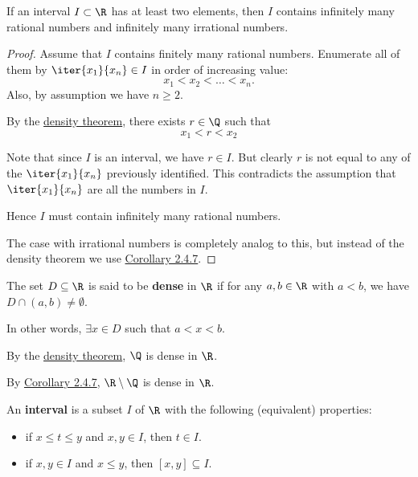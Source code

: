 \label{e43d143}

If an interval $I\subset\R$ has at least two elements, then $I$ contains
infinitely many rational numbers and infinitely many irrational numbers.

\begin{proof}
  \def\all{\iter{x_1}{x_n}}

  Assume that $I$ contains finitely many rational numbers. Enumerate all of them
  by $\all\in I$ in order of increasing value:
  $$
    x_1<x_2<\ldots<x_n.
  $$
  Also, by assumption we have $n\geq2$.

  By the \href{d0c9c52}{density theorem}, there exists $r\in\Q$ such that
  $$
    x_1<r<x_2
  $$

  Note that since $I$ is an interval, we have $r\in I$. But clearly $r$ is not
  equal to any of the $\all$ previously identified. This contradicts the
  assumption that $\all$ are all the numbers in $I$.

  Hence $I$ must contain infinitely many rational numbers.

  The case with irrational numbers is completely analog to this, but instead of
  the density theorem we use \href{b0d86cf}{Corollary 2.4.7}.
\end{proof}

\label{e929c5e}

The set $D\subseteq\R$ is said to be \textbf{dense} in $\R$ if for any
$a,b\in\R$ with $a<b$, we have $D\cap(a,b)\neq\emptyset$.

In other words, $\exists x\in D$ such that $a<x<b$.

\label{bb3cf6b}

\begin{enumerati}
  \item By the \href{d0c9c52}{density theorem}, $\Q$ is dense in $\R$.
  \item By \href{b0d86cf}{Corollary 2.4.7}, $\R\setminus\Q$ is dense in $\R$.
\end{enumerati}

\label{c65e94a}

An \textbf{interval} is a subset $I$ of $\R$ with the following (equivalent)
properties:
\begin{itemize}
  \item if $x\leq t\leq y$ and $x,y\in I$, then $t\in I$.
  \item if $x,y\in I$ and $x\leq y$, then $[x,y]\subseteq I$.
\end{itemize}

